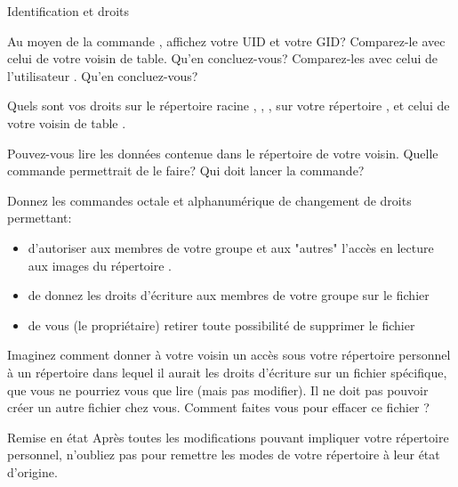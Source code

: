 \begin{exercice}
  \begin{exercicelet}{Identification et droits}
    \begin{questions}
    \item Au moyen de la commande , affichez votre UID et votre GID?
      Comparez-le avec celui de votre voisin de table. Qu'en concluez-vous?
      Comparez-les avec celui de l'utilisateur . Qu'en
      concluez-vous?
    \item Quels sont vos droits sur le répertoire racine \lin{/}, ,
      , sur votre répertoire \lin{\~\//}, et celui de votre voisin
      de table .
    \item Pouvez-vous lire les données contenue dans le répertoire de votre
      voisin. Quelle commande permettrait de le faire? Qui doit lancer la
      commande?
    \item Donnez les commandes octale et alphanumérique de changement de
      droits permettant:
      \begin{itemize}
      \item d'autoriser aux membres de votre groupe et aux "autres" l'accès en
        lecture aux images du répertoire .
      \item de donnez les droits d'écriture aux membres de votre groupe sur le
        fichier 
      \item de vous (le propriétaire) retirer toute possibilité de supprimer
        le fichier 
      \end{itemize}
    \item Imaginez comment donner à votre voisin un accès sous votre
      répertoire personnel à un répertoire dans lequel il aurait les droits
      d'écriture sur un fichier spécifique, que vous ne pourriez vous que lire
      (mais pas modifier). Il ne doit pas pouvoir créer un autre fichier chez
      vous. Comment faites vous pour effacer ce fichier ?
    \end{questions}
  \end{exercicelet}
\end{exercice}
\begin{exercice}
  \begin{exercicelet}{Remise en état}
    Après toutes les modifications pouvant impliquer votre répertoire
    personnel, n'oubliez pas  pour remettre les modes de
    votre répertoire à leur état d'origine.
  \end{exercicelet}
\end{exercice}
